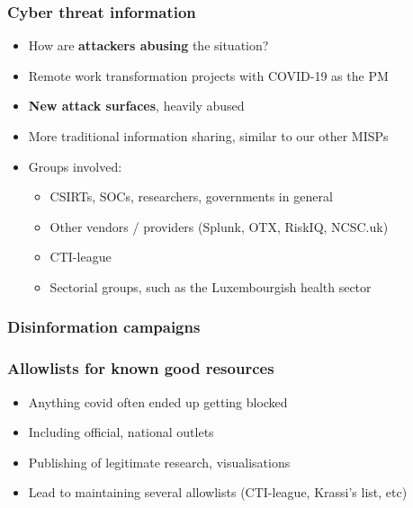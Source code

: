 \begin{frame}
 \frametitle{Cyber threat information}
 \begin{itemize}
         \item How are {\bf attackers abusing} the situation?
         \item Remote work transformation projects with COVID-19 as the PM
         \item {\bf New attack surfaces}, heavily abused
         \item More traditional information sharing, similar to our other MISPs
         \item Groups involved:
         \begin{itemize}
              \item CSIRTs, SOCs, researchers, governments in general
              \item Other vendors / providers (Splunk, OTX, RiskIQ, NCSC.uk)
              \item CTI-league
              \item Sectorial groups, such as the Luxembourgish health sector
         \end{itemize}
 \end{itemize}
\end{frame}

\begin{frame}
 \frametitle{Disinformation campaigns}
\end{frame}

\begin{frame}
 \frametitle{Allowlists for known good resources}
 \begin{itemize}
         \item Anything covid often ended up getting blocked
         \item Including official, national outlets
         \item Publishing of legitimate research, visualisations
         \item Lead to maintaining several allowlists (CTI-league, Krassi's list, etc)
 \end{itemize}
\end{frame}

